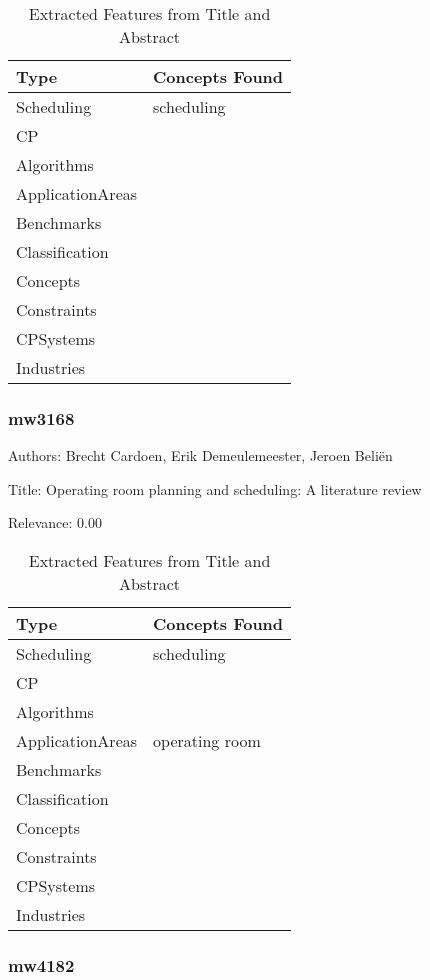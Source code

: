 {\scriptsize
\begin{longtable}{p{2cm}p{20cm}}
\caption{Extracted Features from Title and Abstract}\\ \toprule
Type & Concepts Found\\ \midrule
\endhead
\bottomrule
\endfoot
Scheduling & scheduling\\ 
CP & \\ 
Algorithms & \\ 
ApplicationAreas & \\ 
Benchmarks & \\ 
Classification & \\ 
Concepts & \\ 
Constraints & \\ 
CPSystems & \\ 
Industries & \\ 
\end{longtable}
}



\subsubsection{mw3168}
\label{mw:mw3168}

Authors: Brecht Cardoen, Erik Demeulemeester, Jeroen Beliën

Title: Operating room planning and scheduling: A literature review

Relevance:  0.00

{\scriptsize
\begin{longtable}{p{2cm}p{20cm}}
\caption{Extracted Features from Title and Abstract}\\ \toprule
Type & Concepts Found\\ \midrule
\endhead
\bottomrule
\endfoot
Scheduling & scheduling\\ 
CP & \\ 
Algorithms & \\ 
ApplicationAreas & operating room\\ 
Benchmarks & \\ 
Classification & \\ 
Concepts & \\ 
Constraints & \\ 
CPSystems & \\ 
Industries & \\ 
\end{longtable}
}



\subsubsection{mw4182}
\label{mw:mw4182}

